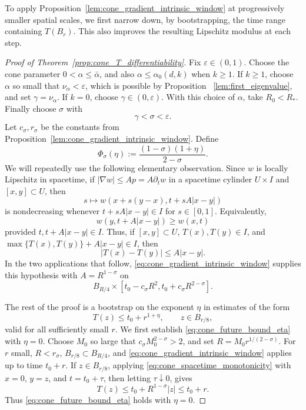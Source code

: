 \documentclass[11pt]{amsart}
\numberwithin{equation}{section}
\numberwithin{figure}{section}
\theoremstyle{plain}
\theoremstyle{definition}
\theoremstyle{remark}
\theoremstyle{plain}
\begin{document}
To apply Proposition~\ref{lem:cone_gradient_intrinsic_window} at progressively smaller spatial scales, we first narrow down, by bootstrapping, the time range containing \(T(B_r)\). This also improves the resulting Lipschitz modulus at each step.
\begin{proof}[Proof of Theorem~\ref{prop:cone_T_differentiability}]
Fix \(\varepsilon\in(0,1)\). Choose the cone parameter
\(0<\alpha\leq\bar\alpha\), and also \(\alpha\leq\alpha_0(d,k)\) when
\(k\geq1\).  If \(k\geq1\), choose \(\alpha\) so small that
\(\nu_\alpha<\varepsilon\), which is possible by
Proposition ~\ref{lem:first_eigenvalue}, and set \(\gamma=\nu_\alpha\).  If \(k=0\),
choose \(\gamma\in(0,\varepsilon)\).  With this choice of \(\alpha\), take
\(R_0<R_*\).  Finally choose
\(\sigma\) with
\[
    \gamma<\sigma<\varepsilon .
\]
Let \(c_\sigma,r_\sigma\) be the constants from
Proposition~\ref{lem:cone_gradient_intrinsic_window}.  Define
\[
    \Phi_\sigma(\eta):=\frac{(1-\sigma)(1+\eta)}{2-\sigma}.
\]
We will repeatedly use the following elementary observation. Since $w$ is
locally Lipschitz in spacetime, if $|\nabla w|\leq A p=A \partial_t w$ in a spacetime
cylinder $U\times I$ and $[x,y]\subset U$, then
\[
    s\mapsto w(x+s(y-x),t+sA|x-y|)
\]
is nondecreasing whenever $t+sA|x-y|\in I$ for $s\in[0,1]$. Equivalently,
\begin{equation}\label{eq:cone_spacetime_monotonicity}
    w(y,t+A|x-y|)\geq w(x,t)
\end{equation}
provided $t,t+A|x-y|\in I$. Thus, if $[x,y]\subset U$, $T(x),T(y)\in I$, and
$\max\{T(x),T(y)\}+A|x-y|\in I$, then
\begin{equation}\label{eq:cone_T_lipschitz_from_gradient}
    |T(x)-T(y)|\leq A|x-y|.
\end{equation}
In the two applications that follow, \eqref{eq:cone_gradient_intrinsic_window}
supplies this hypothesis with \(A=R^{1-\sigma}\) on
\[
    B_{R/4}\times[t_0-c_\sigma R^2,t_0+c_\sigma R^{2-\sigma}].
\]

The rest of the proof is a bootstrap on the exponent \(\eta\) in estimates of the
form
\begin{equation}\label{eq:cone_future_bound_eta}
    T(z)\leq t_0+r^{1+\eta},\qquad z\in B_{r/8},
\end{equation}
valid for all sufficiently small \(r\). We first establish
\eqref{eq:cone_future_bound_eta} with \(\eta=0\). Choose \(M_0\) so large that
$c_\sigma M_0^{2-\sigma}>2$, and set
\(R=M_0r^{1/(2-\sigma)}\). For \(r\) small, \(R<r_\sigma\),
$B_{r/8}\subset B_{R/4}$, and \eqref{eq:cone_gradient_intrinsic_window} applies
up to time \(t_0+r\). If \(z\in B_{r/8}\), applying
\eqref{eq:cone_spacetime_monotonicity} with $x=0$, $y=z$, and
$t=t_0+\tau$, then letting $\tau\downarrow0$, gives
\[
    T(z)\leq t_0+R^{1-\sigma}|z|\leq t_0+r.
\]
Thus \eqref{eq:cone_future_bound_eta} holds with \(\eta=0\).


\end{proof}
\end{document}

